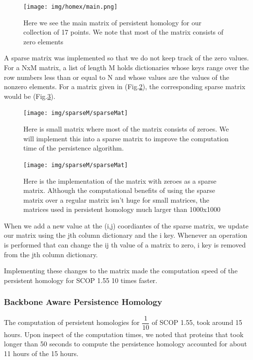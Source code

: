 \documentclass[12pt, a4paper, twocolumn, fullpage]{article}
\theoremstyle{plain}
\theoremstyle{definition}
\theoremstyle{remark}
\begin{document}
\begin{figure}
	\centering
    \texttt{[image: img/homex/main.png]}
    \caption{Here we see the main matrix of persistent homology for our collection of 17 points. We note that most of the matrix consists of zero elements}
    \label{1ux8MainMatrix}
\end{figure}

A sparse matrix was implemented so that we do not keep track of the zero values. For a NxM matrix, a list of length M holds dictionaries whose keys range over the row numbers less than or equal to N and whose values are the values of the nonzero elements. For a matrix given in (Fig.\ref{spmat}), the corresponding sparse matrix would be (Fig.\ref{sparseImpl}).

\begin{figure}[H]
    \texttt{[image: img/sparseM/sparseMat]}
    \caption{Here is small matrix where most of the matrix consists of zeroes. We will implement this into a sparse matrix to improve the computation time of the persistence algorithm.}
    \label{spmat}
\end{figure}

\begin{figure}[H]
    \texttt{[image: img/sparseM/sparseMat]}
    \caption{Here is the implementation of the matrix with zeroes as a sparse matrix. Although the computational benefits of using the sparse matrix over a regular matrix isn't huge for small matrices, the matrices used in persistent homology much larger than 1000x1000}
    \label{sparseImpl}
\end{figure}

When we add a new value at the (i,j) coordiantes of the sparse matrix, we update our matrix using the jth column dictionary and the i key. Whenever an operation is performed that can change the ij th value of a matrix to zero, i key is removed from the jth column dictionary.

Implementing these changes to the matrix made the computation speed of the persistent homology for SCOP 1.55 10 times faster.

\subsubsection{ Backbone Aware Persistence Homology}

The computation of persistent homologies for $\dfrac{1}{10}$ of SCOP 1.55, took around 15 hours. Upon inspect of the computation times, we noted that proteins that took longer than 50 seconds to compute the persistence homology accounted for about 11 hours of the 15 hours. 
\end{document}
